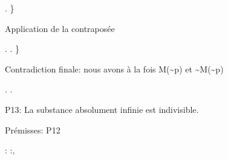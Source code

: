 \documentclass[10pt]{report}
\begin{document}
\begin{coqdoccode}
\begin{coqdoccomment}
\end{coqdoccomment}
\coqdoceol
\coqdocindent{3.00em}
.\coqdoceol
\coqdocindent{2.00em}
\}\coqdoceol
\coqdocindent{2.00em}
\begin{coqdoccomment}
\coqdocindent{0.50em}
Application\coqdocindent{0.50em}
de\coqdocindent{0.50em}
la\coqdocindent{0.50em}
contraposée\coqdocindent{0.50em}
\end{coqdoccomment}
\coqdoceol
\coqdocindent{2.00em}
 .\coqdoceol
\coqdocindent{2.00em}
 .\coqdoceol
\coqdocindent{1.00em}
\}\coqdoceol
\coqdocindent{1.00em}
\coqdoceol
\coqdocindent{1.00em}
\begin{coqdoccomment}
\coqdocindent{0.50em}
Contradiction\coqdocindent{0.50em}
finale:\coqdocindent{0.50em}
nous\coqdocindent{0.50em}
avons\coqdocindent{0.50em}
à\coqdocindent{0.50em}
la\coqdocindent{0.50em}
fois\coqdocindent{0.50em}
M(\~{}p)\coqdocindent{0.50em}
et\coqdocindent{0.50em}
\~{}M(\~{}p)\coqdocindent{0.50em}
\end{coqdoccomment}
\coqdoceol
\coqdocindent{1.00em}
.\coqdoceol
\coqdocnoindent
{}.\coqdoceol
\coqdocemptyline
\coqdocnoindent
\begin{coqdoccomment}
\coqdocindent{0.50em}
P13:\coqdocindent{0.50em}
La\coqdocindent{0.50em}
substance\coqdocindent{0.50em}
absolument\coqdocindent{0.50em}
infinie\coqdocindent{0.50em}
est\coqdocindent{0.50em}
indivisible.\coqdocindent{0.50em}
\end{coqdoccomment}
\coqdoceol
\coqdocnoindent
\begin{coqdoccomment}
\coqdocindent{0.50em}
Prémisses:\coqdocindent{0.50em}
P12\coqdocindent{0.50em}
\end{coqdoccomment}
\coqdoceol
\coqdocnoindent
{}  : \coqdockw{\ensuremath{\forall}}   :,\coqdoceol
\coqdocindent{1.00em}

\end{coqdoccode}
\end{document}
